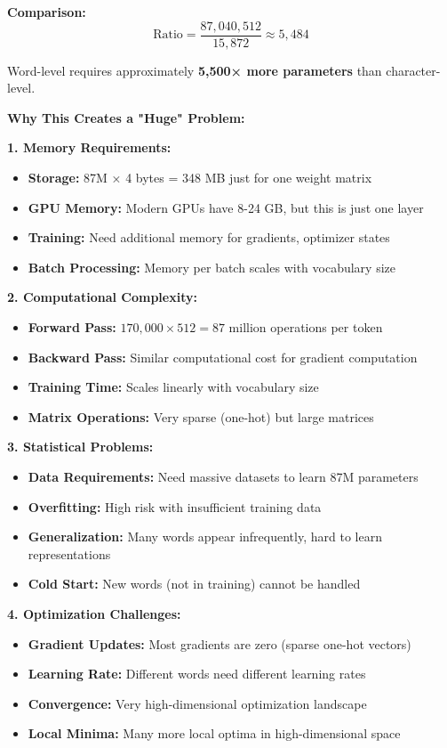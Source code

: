 \documentclass[12pt]{article}
\begin{document}
\begin{enumerate}[(a)]
{    \textbf{Comparison:}
    $$\text{Ratio} = \frac{87,040,512}{15,872} \approx 5,484$$
    
    Word-level requires approximately \textbf{5,500× more parameters} than character-level.
    
    \textbf{Why This Creates a "Huge" Problem:}
    
    \textbf{1. Memory Requirements:}
    \begin{itemize}
        \item \textbf{Storage:} 87M × 4 bytes = 348 MB just for one weight matrix
        \item \textbf{GPU Memory:} Modern GPUs have 8-24 GB, but this is just one layer
        \item \textbf{Training:} Need additional memory for gradients, optimizer states
        \item \textbf{Batch Processing:} Memory per batch scales with vocabulary size
    \end{itemize}
    
    \textbf{2. Computational Complexity:}
    \begin{itemize}
        \item \textbf{Forward Pass:} $170,000 \times 512 = 87$ million operations per token
        \item \textbf{Backward Pass:} Similar computational cost for gradient computation
        \item \textbf{Training Time:} Scales linearly with vocabulary size
        \item \textbf{Matrix Operations:} Very sparse (one-hot) but large matrices
    \end{itemize}
    
    \textbf{3. Statistical Problems:}
    \begin{itemize}
        \item \textbf{Data Requirements:} Need massive datasets to learn 87M parameters
        \item \textbf{Overfitting:} High risk with insufficient training data
        \item \textbf{Generalization:} Many words appear infrequently, hard to learn representations
        \item \textbf{Cold Start:} New words (not in training) cannot be handled
    \end{itemize}
    
    \textbf{4. Optimization Challenges:}
    \begin{itemize}
        \item \textbf{Gradient Updates:} Most gradients are zero (sparse one-hot vectors)
        \item \textbf{Learning Rate:} Different words need different learning rates
        \item \textbf{Convergence:} Very high-dimensional optimization landscape
        \item \textbf{Local Minima:} Many more local optima in high-dimensional space
    \end{itemize}
    
}
\end{enumerate}
\end{document}
